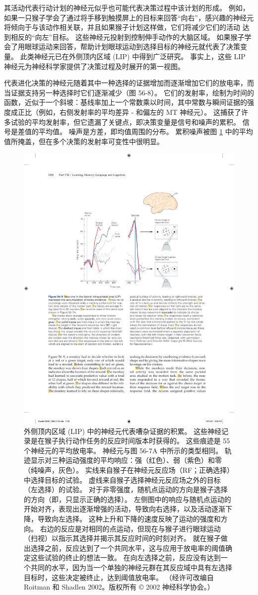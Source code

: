 其活动代表行动计划的神经元似乎也可能代表决策过程中该计划的形成。 例如，如果一只猴子学会了通过将手移到触摸屏上的目标来回答“向右”，感兴趣的神经元将倾向于与该动作相关联，并且如果猴子计划这样做，它们将减少它们的活动 达到相反的“向左”目标。 这些神经元投射到控制伸手动作的大脑区域。 如果猴子学会了用眼球运动来回答，帮助计划眼球运动到选择目标的神经元就代表了决策变量。 此类神经元已在外侧顶内区域 (LIP) 中得到广泛研究。 事实上，这些 LIP 神经元为神经科学家提供了决策过程及时展开的第一视图。

代表进化决策的神经元随着其中一种选择的证据增加而逐渐增加它们的放电率，而当证据支持另一种选择时它们逐渐减少（图 56-8）。 它们的发射率，绘制为时间的函数，近似于一个斜坡：基线率加上一个常数乘以时间，其中常数与瞬间证据的强度成正比（例如，右侧发射率的平均差异 - 和偏左的 MT 神经元）。 这捕获了许多试验的平均发射率，但它遗漏了关键点，即决策变量是信号和噪声的累积。 信号是差值的平均值。 噪声是方差，即均值周围的分布。 累积噪声被图 \ref{fig:56_8} 中的平均值所掩盖，但在多个决策的发射率可变性中很明显。

\begin{figure}[htbp]
	\centering
	\includegraphics[width=0.65\linewidth]{chap56/fig_56_8}
	\caption{外侧顶内区域 (LIP) 中的神经元代表嘈杂证据的积累。 这些神经记录是在猴子执行动作任务的反应时间版本时获得的。 这些痕迹是 55 个神经元的平均放电率。 神经元与图 56-7A 中所示的类型相同。 轨迹显示对三种运动强度的平均响应：强（红色）、弱（紫色）和零（纯噪声，灰色）。 实线来自猴子在神经元反应场（RF；正确选择）中选择目标的试验。 虚线来自猴子选择神经元反应场之外的目标（左选择）的试验。 对于非零强度，随机点运动的方向是猴子选择的方向（即，只显示正确的选择）。 左侧图中的响应与随机点运动的开始对齐，表现出逐渐增强的活动，导致向右选择，以及活动逐渐下降，导致向左选择。 这种上升和下降的速度反映了运动的强度和方向。 右边的反应是对相同的点运动，但现在与猴子进行眼球运动（扫视）以指示其选择并揭示其反应时间的时刻对齐。 就在猴子做出选择之前，反应达到了一个共同水平，这与应用于放电率的阈值确定这些试验的终止的想法一致。 在向左选择之前，反应没有达到一个共同的水平，因为当一个单独的神经元群在其反应域中具有左选择目标时，这些决定被终止，达到阈值放电率。 （经许可改编自 Roitman 和 Shadlen 2002。版权所有 © 2002 神经科学协会。）}
	\label{fig:56_8}
\end{figure}

